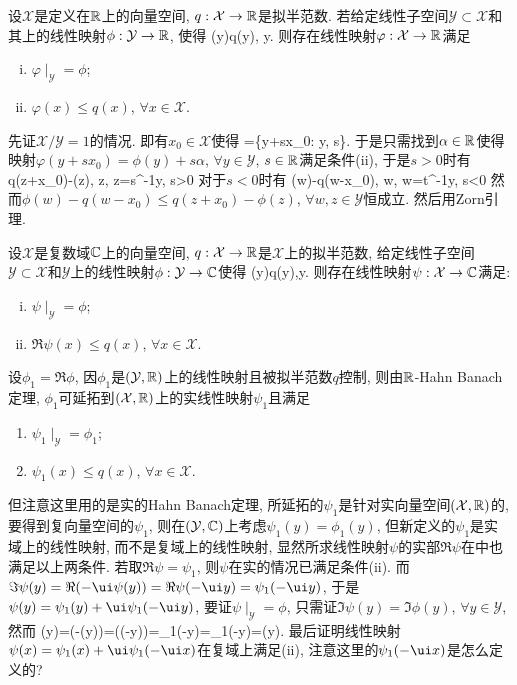 设$\mathcal X$是定义在$\Bbb R$上的向量空间, $q: \mathcal{X}\to \Bbb R$是拟半范数. 
若给定线性子空间$\mathcal{Y}\subset\mathcal{X}$和其上的线性映射$\phi: \mathcal{Y}\to\Bbb R$, 使得
\bee
\phi(y)\le q(y), \forall y\in{}.
\eee
则存在线性映射$\varphi: \mathcal{X}\to\Bbb R$满足
\begin{enumerate}[(i)]
 \item $\varphi\mid_{\mathcal{Y}}=\phi$;
 \item $\varphi(x)\le q(x)$, $\forall x\in\mathcal{X}$.
\end{enumerate}
\et
\ba
先证$\mathcal{X}/\mathcal{Y}=1$的情况. 即有$x_0\in \mathcal{X}$使得
\bee
{}=\{y+sx_0: y\in{}, s\in{}\}.
\eee
于是只需找到$\alpha\in\Bbb R$使得映射$\varphi(y+sx_0)=\phi(y)+s\alpha$, $\forall y\in\mathcal{Y}$, 
$s\in\Bbb R$满足条件(ii), 于是$s>0$时有
\bee
\alpha\le q(z+x_0)-\phi(z), \forall z\in{}, z=s^{-1}y, s>0
\eee
对于$s<0$时有
\bee
\alpha\ge\phi(w)-q(w-x_0), \forall w\in{}, w=t^{-1}y, s<0
\eee
然而$\phi(w)-q(w-x_0)\le q(z+x_0)-\phi(z)$, $\forall w,z\in\mathcal{Y}$恒成立.
然后用Zorn引理.
\ea

设$\mathcal{X}$是复数域$\Bbb C$上的向量空间, $q: \mathcal{X}\to\Bbb R$是$\mathcal{X}$上的拟半范数, 
给定线性子空间$\mathcal{Y}\subset\mathcal{X}$和$\mathcal{Y}$上的线性映射$\phi: \mathcal{Y}\to\Bbb C$使得
\bee
\Re\phi(y)\le q(y),\quad\forall y\in{}.
\eee
则存在线性映射$\psi:\mathcal{X}\to\Bbb C$满足:
\begin{enumerate}[(i)]
 \item $\psi\mid_{\mathcal{Y}}=\phi$;
 \item $\Re\psi(x)\le q(x)$, $\forall x\in\mathcal{X}$.
\end{enumerate}
\eu
\ba
设$\phi_1=\Re\phi$, 因$\phi_1$是$(\mathcal{Y},\Bbb R)$上的线性映射且被拟半范数$q$控制, 
则由$\Bbb R$-Hahn Banach定理, $\phi_1$可延拓到$(\mathcal{X},\Bbb R)$上的实线性映射$\psi_1$且满足
\begin{enumerate}[(i')]
 \item $\psi_1\mid_{\mathcal{Y}}=\phi_1$;
 \item $\psi_1(x)\le q(x)$, $\forall x\in\mathcal{X}$.
\end{enumerate}
但注意这里用的是实的Hahn Banach定理, 所延拓的$\psi_1$是针对实向量空间$(\mathcal{X},\Bbb R)$的, 要得到复向量空间的$\psi_1$, 
则在$(\mathcal{Y},\Bbb C)$上考虑$\psi_1(y)=\phi_1(y)$, 但新定义的$\psi_1$是实域上的线性映射, 而不是复域上的线性映射, 
显然所求线性映射$\psi$的实部$\Re\psi$在{\color{red}{实线性空间}}中也满足以上两条件. 
若取$\Re \psi=\psi_1$, 则$\psi$在实的情况已满足条件(ii). 而$\Im\psi(y)=\Re(-\ui\psi(y))=\Re\psi(-\ui y)=\psi_1(-\ui y)$, 于是$\psi(y)=\psi_1(y)+\ui\psi_1(-\ui y)$, 
要证$\psi\mid_{\mathcal{Y}}=\phi$, 只需证$\Im\psi(y)=\Im\phi(y)$, $\forall y\in\mathcal{Y}$, 然而
\bee
\Im\phi(y)=\Re(-\ui\phi(y))=\Re(\phi(-\ui y))=\phi_1(-\ui y)=\psi_1(-\ui y)=\Im\psi(y).
\eee
最后证明线性映射$\psi(x)=\psi_1(x)+\ui\psi_1(-\ui x)$在复域上满足(ii), 注意这里的$\psi_1(-\ui x)$是怎么定义的?
\ea

